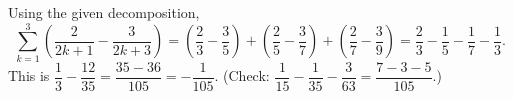 Using the given decomposition,
\[
\sum_{k=1}^{3}\left(\dfrac{2}{2k+1}-\dfrac{3}{2k+3}\right)=\left(\dfrac{2}{3}-\dfrac{3}{5}\right)+\left(\dfrac{2}{5}-\dfrac{3}{7}\right)+\left(\dfrac{2}{7}-\dfrac{3}{9}\right)=\dfrac{2}{3}-\dfrac{1}{5}-\dfrac{1}{7}-\dfrac{1}{3} .
\]
This is $\dfrac{1}{3}-\dfrac{12}{35}=\dfrac{35-36}{105}=\boxed{-\dfrac{1}{105}}$. (Check: $\dfrac{1}{15}-\dfrac{1}{35}-\dfrac{3}{63}=\dfrac{7-3-5}{105}$.)
